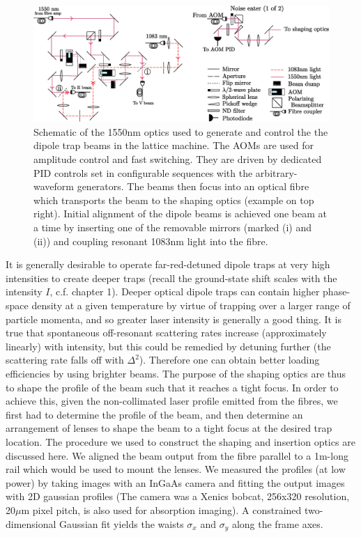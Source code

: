 	
	
	\begin{figure}
		\centering
		\includegraphics[width=\textwidth]{fig/lattice/dipole_optics}
		\caption{Schematic of the 1550nm optics used to generate and control the the dipole trap beams in the lattice machine.
		The AOMs are used for amplitude control and fast switching.
		They are driven by dedicated PID controls set in configurable sequences with the arbitrary-waveform generators.
		The beams then focus into an optical fibre which transports the beam to the shaping optics (example on top right).
		Initial alignment of the dipole beams is achieved one beam at a time by inserting one of the removable mirrors (marked (i) and (ii)) and coupling resonant 1083nm light into the fibre.}
		\label{fig:dipole_optics}
	\end{figure}
	

	It is generally desirable to operate far-red-detuned dipole traps at very high intensities to create deeper traps (recall the ground-state shift scales with the intensity $I$, c.f.
	chapter 1).
	Deeper optical dipole traps can contain higher phase-space density at a given temperature by virtue of trapping over a larger range of particle momenta, and so greater laser intensity is generally a good thing.
	It is true that spontaneous off-resonant scattering rates increase (approximately linearly) with intensity, but this could be remedied by detuning further (the scattering rate falls off with $\Delta^2$).
	Therefore one can obtain better loading efficiencies by using brighter beams.
	The purpose of the shaping optics are thus to shape the profile of the beam such that it reaches a tight focus.
	In order to achieve this, given the non-collimated laser profile emitted from the fibres, we first had to determine the profile of the beam, and then determine an arrangement of lenses to shape the beam to a tight focus at the desired trap location.
	The procedure we used to construct the shaping and insertion optics are discussed here.
	We aligned the beam output from the fibre parallel to a 1m-long rail which would be used to mount the lenses.
	We measured the profiles (at low power) by taking images with an InGaAs camera and fitting the output images with 2D gaussian profiles (The camera was a  Xenics bobcat, 256x320 resolution, 20$\mu$m pixel pitch, is also used for absorption imaging).
	A constrained two-dimensional Gaussian fit yields the waists $\sigma_x$ and $\sigma_y$ along the frame axes.

